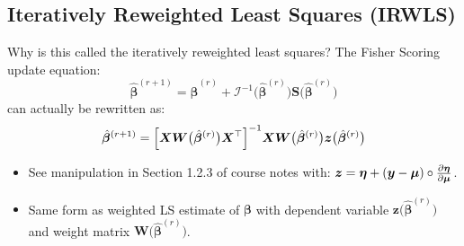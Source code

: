 \documentclass[oneside]{book}\usepackage[]{graphicx}\usepackage[svgnames]{xcolor}
\providecommand{\Vector}[1]{\bm{#1}}%
\providecommand{\Matrix}[1]{\bm{#1}}
\begin{document}
\subsection*{Iteratively Reweighted Least Squares (IRWLS)}
Why is this called the iteratively reweighted least squares?
The Fisher Scoring update equation:
\[ \hat{\Vector{\beta}}^{(r+1)}=\hat{\Vector{\beta}}^{(r)}+\mathcal{I}^{-1}\bigl(\hat{\Vector{\beta}}^{(r)}\bigr)\Vector{S}\bigl(\hat{\Vector{\beta}}^{(r)}\bigr) \]
can actually be rewritten as:
\[ \hat{\Vector{\beta}}^{(r+1)}=\Bigl[\Matrix{X}\Matrix{W}\bigl(\hat{\Vector{\beta}}^{(r)}\bigr)\Matrix{X}^\top\Bigr]^{-1}\Matrix{X}\Matrix{W}\bigl(\hat{\Vector{\beta}}^{(r)}\bigr)\Vector{z}\bigl(\hat{\Vector{\beta}}^{(r)}\bigr) \]
\begin{itemize}
    \item See manipulation in Section 1.2.3 of course notes with: $ \Vector{z}=\Vector{\eta}+(\Vector{y}-\Vector{\mu})\circ\pdv{\Vector{\eta}}{\Vector{\mu}} $.
    \item Same form as weighted LS estimate of $ \Vector{\beta} $ with dependent variable $ \Vector{z}\bigl(\hat{\Vector{\beta}}^{(r)}\bigr) $ and weight matrix
          $\Matrix{W}\bigl(\hat{\Vector{\beta}}^{(r)}\bigr) $.
\end{itemize}
\end{document}
